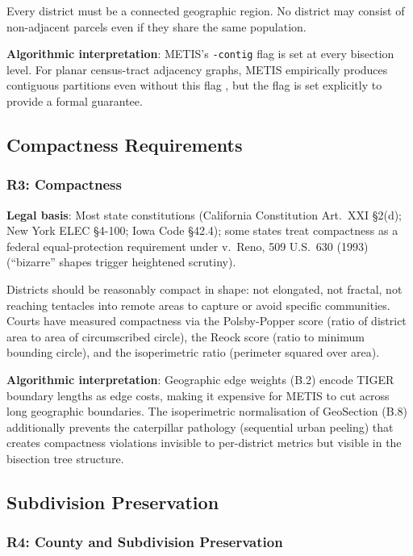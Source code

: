 Every district must be a connected geographic region.
No district may consist of non-adjacent parcels even if they share the same
population.

\textbf{Algorithmic interpretation}: METIS's \texttt{-contig} flag is set at
every bisection level.
For planar census-tract adjacency graphs, METIS empirically produces contiguous
partitions even without this flag \citep{b8paper}, but the flag is set explicitly
to provide a formal guarantee.

\subsection{Compactness Requirements}

\subsubsection*{R3: Compactness}

\textbf{Legal basis}: Most state constitutions (California Constitution Art.\ XXI
\S2(d); New York ELEC \S4-100; Iowa Code \S42.4); some states treat compactness
as a federal equal-protection requirement under \shaw{} v.\ Reno, 509 U.S.\ 630
(1993) (``bizarre'' shapes trigger heightened scrutiny).

Districts should be reasonably compact in shape: not elongated, not fractal,
not reaching tentacles into remote areas to capture or avoid specific communities.
Courts have measured compactness via the Polsby-Popper score (ratio of district
area to area of circumscribed circle), the Reock score (ratio to minimum
bounding circle), and the isoperimetric ratio (perimeter squared over area).

\textbf{Algorithmic interpretation}: Geographic edge weights (B.2) encode TIGER
boundary lengths as edge costs, making it expensive for METIS to cut across long
geographic boundaries.
The isoperimetric normalisation of GeoSection (B.8) additionally prevents the
caterpillar pathology (sequential urban peeling) that creates compactness violations
invisible to per-district metrics but visible in the bisection tree structure.

\subsection{Subdivision Preservation}

\subsubsection*{R4: County and Subdivision Preservation}

